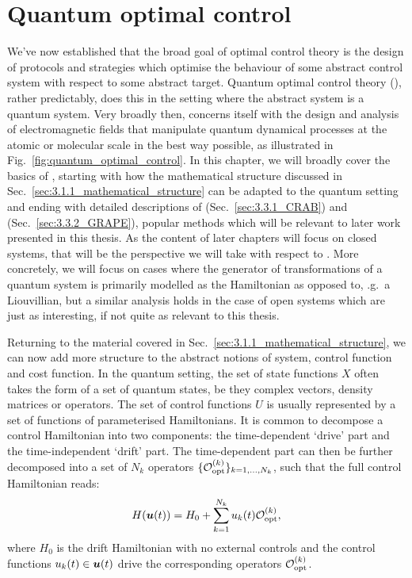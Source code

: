 \section{Quantum optimal control}\label{sec:3.2_Quantum_optimal_control}

We've now established that the broad goal of optimal control theory is the design of protocols and strategies which optimise the behaviour of some abstract control system with respect to some abstract target. Quantum optimal control theory (), rather predictably, does this in the setting where the abstract system is a quantum system. Very broadly then,  concerns itself with the design and analysis of electromagnetic fields that manipulate quantum dynamical processes at the atomic or molecular scale in the best way possible, as illustrated in Fig.~\ref{fig:quantum_optimal_control}. In this chapter, we will broadly cover the basics of , starting with how the mathematical structure discussed in Sec.~\ref{sec:3.1.1_mathematical_structure} can be adapted to the quantum setting and ending with detailed descriptions of  (Sec.~\ref{sec:3.3.1_CRAB}) and  (Sec.~\ref{sec:3.3.2_GRAPE}), popular  methods which will be relevant to later work presented in this thesis. As the content of later chapters will focus on closed systems, that will be the perspective we will take with respect to . More concretely, we will focus on cases where the generator of transformations of a quantum system is primarily modelled as the Hamiltonian as opposed to, \@e.g.~a Liouvillian, but a similar analysis holds in the case of open systems which are just as interesting, if not quite as relevant to this thesis.

Returning to the material covered in Sec.~\ref{sec:3.1.1_mathematical_structure}, we can now add more structure to the abstract notions of system, control function and cost function. In the quantum setting, the set of state functions $X$ often takes the form of a set of quantum states, be they complex vectors, density matrices or operators. The set of control functions $U$ is usually represented by a set of functions of parameterised Hamiltonians. It is common to decompose a control Hamiltonian into two components: the time-dependent `drive' part and the time-independent `drift' part. The time-dependent part can then be further decomposed into a set of $N_k$ operators $\{\mathcal{O}_{\rm opt}^{(k)}\}_{k=1,...,N_k}$, such that the full control Hamiltonian reads:
\begin{equation}\label{eq:optimal_control_H}
    H(\boldsymbol{u}(t)) = H_0 + \sum_{k = 1}^{N_k} u_k(t) \mathcal{O}_{\rm opt}^{(k)},
\end{equation}
where $H_0$ is the drift Hamiltonian with no external controls and the control functions $u_k(t) \in \boldsymbol{u}(t)$ drive the corresponding operators $\mathcal{O}_{\rm opt}^{(k)}$.

